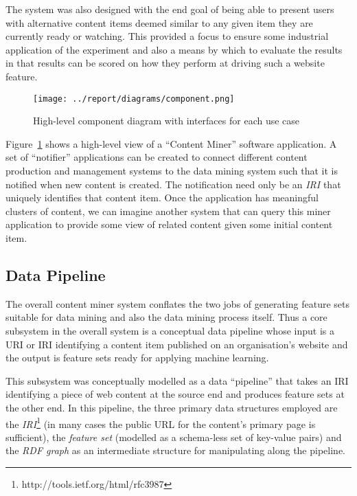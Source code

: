 \documentclass{sig-alternate-05-2015}
\begin{document}
The system was also designed with the end goal of being able to present
users with alternative content items deemed similar to any given item they
are currently ready or watching. This provided a focus to ensure some
industrial application of the experiment and also a means by which to evaluate
the results in that results can be scored on how they perform at driving
such a website feature.

\begin{figure}[h]
  \begin{center}
    \texttt{[image: ../report/diagrams/component.png]}
  \end{center}
  \caption{High-level component diagram with interfaces for each use case\label{fig:component}}
\end{figure}

Figure~\ref{fig:component} shows a high-level view of a ``Content Miner''
software application. A set of ``notifier''
applications can be created to connect different content production and
management systems to the data mining system such that it is notified when new
content is created. The notification need only be an \emph{IRI} that uniquely
identifies that content item. Once the application has meaningful clusters of
content, we can imagine another system that can query this miner application
to provide some view of related content given some initial content item.

\subsection{Data Pipeline}

The overall content miner system conflates the two jobs of generating
feature sets suitable for data mining and also the data mining process itself.
Thus a core subsystem in the overall system is a conceptual data pipeline whose
input is a URI or IRI identifying a content item published on an organisation's
website and the output is feature sets ready for applying machine learning.

This subsystem was conceptually modelled as a data ``pipeline'' that takes
an IRI identifying a piece of web content at the source end and produces
feature sets at the other end. In this pipeline, the three primary data
structures employed are the \emph{IRI}\footnote{http://tools.ietf.org/html/rfc3987}
(in many cases the public URL for the content's primary page is sufficient),
the \emph{feature set} (modelled as a schema-less set of key-value pairs)
and the \emph{RDF graph} as an intermediate structure for manipulating along
the pipeline.
\end{document}
